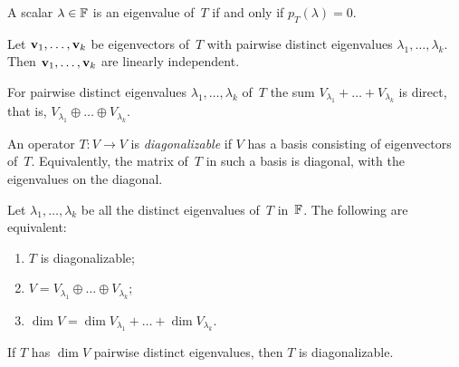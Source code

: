 \begin{theorem}
\label{thm:eigvals-roots}
A scalar $\lambda \in \mathbb{F}$ is an eigenvalue of~$T$ if and only if
$p_T(\lambda) = 0$.
\end{theorem}

\begin{theorem}
\label{thm:distinct-eig-li}
Let $\mathbf{v}_1, \dots, \mathbf{v}_k$ be eigenvectors of~$T$ with
pairwise distinct eigenvalues $\lambda_1, \dots, \lambda_k$. Then
$\mathbf{v}_1, \dots, \mathbf{v}_k$ are linearly independent.
\end{theorem}

\begin{corollary}
\label{cor:eigspaces-direct-sum}
For pairwise distinct eigenvalues $\lambda_1, \dots, \lambda_k$ of~$T$
the sum $V_{\lambda_1} + \dots + V_{\lambda_k}$ is direct, that is,
$V_{\lambda_1} \oplus \dots \oplus V_{\lambda_k}$.
\end{corollary}

\begin{definition}
\label{def:diagonalizable}
An operator $T \colon V \to V$ is \emph{diagonalizable} if $V$ has a
basis consisting of eigenvectors of~$T$. Equivalently, the matrix
of~$T$ in such a basis is diagonal, with the eigenvalues on the
diagonal.
\end{definition}

\begin{theorem}
\label{thm:diag-criterion}
Let $\lambda_1, \dots, \lambda_k$ be all the distinct eigenvalues
of~$T$ in~$\mathbb{F}$. The following are equivalent:
\begin{enumerate}[label=(\alph*)]
  \item $T$ is diagonalizable;
  \item $V = V_{\lambda_1} \oplus \dots \oplus V_{\lambda_k}$;
  \item $\dim V = \dim V_{\lambda_1} + \dots + \dim V_{\lambda_k}$.
\end{enumerate}
\end{theorem}

\begin{corollary}
\label{cor:distinct-implies-diag}
If $T$ has $\dim V$ pairwise distinct eigenvalues, then $T$ is
diagonalizable.
\end{corollary}

